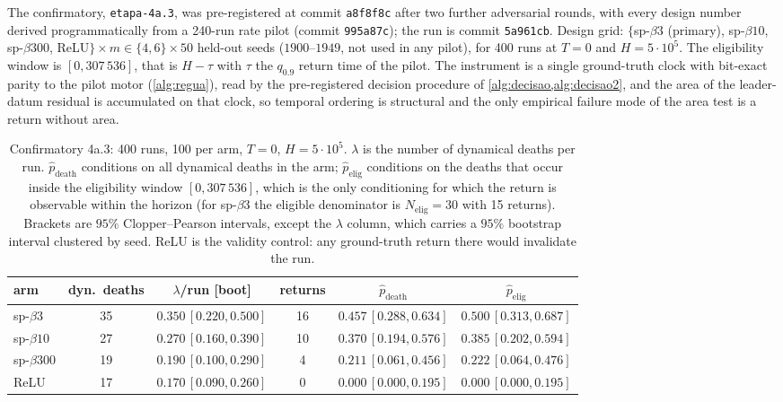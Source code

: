 \documentclass[11pt]{article}
\theoremstyle{definition}
\theoremstyle{remark}
\begin{document}
The confirmatory, \texttt{etapa-4a.3}, was pre-registered at commit \texttt{a8f8f8c} after
two further adversarial rounds, with every design number derived
programmatically from a 240-run rate pilot (commit \texttt{995a87c}); the run is
commit \texttt{5a961cb}. Design grid: $\{$sp-$\beta3$ (primary), sp-$\beta10$,
sp-$\beta300$, ReLU$\}\times m\in\{4,6\}\times50$ held-out seeds
($1900$--$1949$, not used in any pilot), for 400 runs at $T=0$ and
$H=5\cdot10^{5}$. The eligibility window is $[0,307\,536]$, that is $H-\tau$
with $\tau$ the $q_{0.9}$ return time of the pilot. The instrument is a single
ground-truth clock with bit-exact parity to the pilot motor (\cref{alg:regua}),
read by the pre-registered decision procedure of
\cref{alg:decisao,alg:decisao2}, and the area
of the leader-datum residual is accumulated on that clock, so temporal ordering is
structural and the only empirical failure mode of the area test is a return
without area.

\begin{table}[t]
\centering
\caption{Confirmatory 4a.3: 400 runs, 100 per arm, $T=0$, $H=5\cdot10^{5}$.
$\lambda$ is the number of dynamical deaths per run.
$\hat p_{\mathrm{death}}$ conditions on all dynamical deaths in the arm;
$\hat p_{\mathrm{elig}}$ conditions on the deaths that occur inside the
eligibility window $[0,307\,536]$, which is the only conditioning for which the
return is observable within the horizon (for sp-$\beta3$ the eligible denominator
is $N_{\mathrm{elig}}=30$ with 15 returns). Brackets are $95\%$ Clopper--Pearson
intervals, except the $\lambda$ column, which carries a $95\%$ bootstrap interval
clustered by seed. ReLU is the validity control: any ground-truth return there
would invalidate the run.}
\label{tab:4a3}
\small
\begin{tabular}{@{}lccccc@{}}
\toprule
arm & dyn.\ deaths & $\lambda$/run [boot] & returns & $\hat
p_{\mathrm{death}}$ & $\hat p_{\mathrm{elig}}$ \\
\midrule
sp-$\beta3$   & 35 & $0.350\,[0.220,0.500]$ & 16 & $0.457\,[0.288,0.634]$ &
$0.500\,[0.313,0.687]$ \\
sp-$\beta10$  & 27 & $0.270\,[0.160,0.390]$ & 10 & $0.370\,[0.194,0.576]$ &
$0.385\,[0.202,0.594]$ \\
sp-$\beta300$ & 19 & $0.190\,[0.100,0.290]$ & 4  & $0.211\,[0.061,0.456]$ &
$0.222\,[0.064,0.476]$ \\
ReLU          & 17 & $0.170\,[0.090,0.260]$ & 0  & $0.000\,[0.000,0.195]$ &
$0.000\,[0.000,0.195]$ \\
\bottomrule
\end{tabular}
\end{table}
\end{document}
